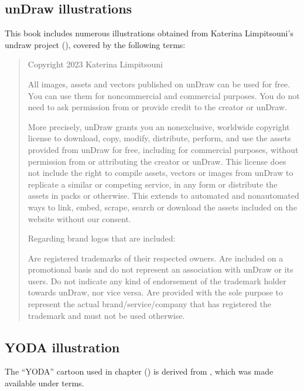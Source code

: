 \subsection{unDraw illustrations}
\label{\detokenize{licenses:undraw-illustrations}}
\sphinxAtStartPar
This book includes numerous illustrations obtained from Katerina Limpitsouni’s undraw project (), covered by the following terms:
\begin{quote}

\sphinxAtStartPar
Copyright 2023 Katerina Limpitsouni

\sphinxAtStartPar
All images, assets and vectors published on unDraw can be used for free.
You can use them for noncommercial and commercial purposes.
You do not need to ask permission from or provide credit to the creator or unDraw.

\sphinxAtStartPar
More precisely, unDraw grants you an nonexclusive, worldwide copyright license to download, copy, modify, distribute, perform, and use the assets provided from unDraw for free, including for commercial purposes, without permission from or attributing the creator or unDraw.
This license does not include the right to compile assets, vectors or images from unDraw to replicate a similar or competing service, in any form or distribute the assets in packs or otherwise.
This extends to automated and non\sphinxhyphen{}automated ways to link, embed, scrape, search or download the assets included on the website without our consent.

\sphinxAtStartPar
Regarding brand logos that are included:

\sphinxAtStartPar
Are registered trademarks of their respected owners.
Are included on a promotional basis and do not represent an association with unDraw or its users.
Do not indicate any kind of endorsement of the trademark holder towards unDraw, nor vice versa.
Are provided with the sole purpose to represent the actual brand/service/company that has registered the trademark and must not be used otherwise.
\end{quote}


\subsection{YODA illustration}
\label{\detokenize{licenses:yoda-illustration}}
\sphinxAtStartPar
The “YODA” cartoon used in chapter {\hyperref[\detokenize{basics/basics-yoda:chapter-yoda}]{}} () is derived from , which was made available under  terms.


